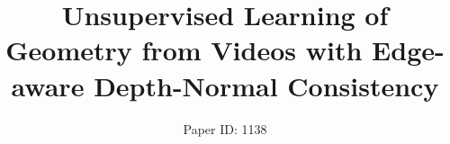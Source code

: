 \documentclass[letterpaper]{article}
\begin{document}
\title{Unsupervised Learning of Geometry from Videos with Edge-aware Depth-Normal Consistency}
\author{Paper ID: 1138}

\maketitle






% 





\small


\end{document}

